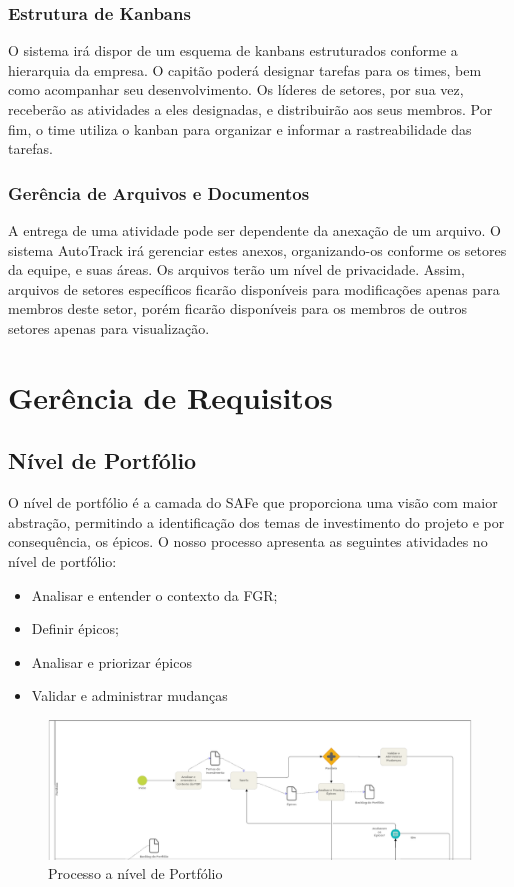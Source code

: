 \subsection{Estrutura de Kanbans}
O sistema irá dispor de um esquema de kanbans estruturados conforme a hierarquia da empresa. O capitão poderá designar tarefas para os times,
bem como acompanhar seu desenvolvimento. Os líderes de setores, por sua vez, receberão as atividades a eles designadas,
 e distribuirão aos seus membros. Por fim, o time utiliza o kanban para organizar e informar a rastreabilidade das tarefas.

\subsection{Gerência de Arquivos e Documentos}
A entrega de uma atividade pode ser dependente da anexação de um arquivo. O sistema AutoTrack irá
gerenciar estes anexos, organizando-os conforme os setores da equipe, e suas áreas. Os arquivos terão um nível de privacidade.
 Assim, arquivos de setores específicos ficarão disponíveis para modificações apenas para membros deste setor, porém
  ficarão disponíveis para os membros de outros setores apenas para visualização.


\chapter{Gerência de Requisitos}
\section{Nível de Portfólio}
O nível de portfólio é a camada do SAFe que proporciona uma visão com maior abstração, permitindo a identificação dos temas de investimento
do projeto e por consequência, os épicos. O nosso processo apresenta as seguintes atividades no nível de portfólio:

\begin{itemize}
  \item Analisar e entender o contexto da FGR;
  \item Definir épicos;
  \item Analisar e priorizar épicos
  \item Validar e administrar mudanças
\end{itemize}

\pagebreak

\begin{figure}[!h]
        \centering
        \includegraphics[keepaspectratio=true,scale=0.42]{figuras/prog.eps}
        \caption{Processo a nível de Portfólio}
\end{figure}

